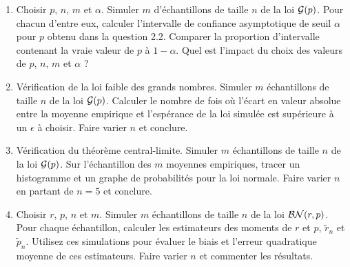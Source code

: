 \documentclass[12pt]{article}
\begin{document}
\begin{enumerate}

\renewcommand{\labelenumi}{\arabic{section}.\arabic{enumi}.}

\item Choisir $p$, $n$, $m$ et $\alpha$. Simuler $m$ d'échantillons de taille $n$ de la loi ${\cal G}(p)$. Pour chacun d'entre eux, calculer l'intervalle de confiance asymptotique de seuil $\alpha$ pour $p$ obtenu dans la question 2.2. Comparer la proportion d'intervalle contenant la vraie valeur de $p$ à $1-\alpha$. Quel est l'impact du choix des valeurs de $p$, $n$, $m$ et $\alpha$ ?

\vspace{3mm}

\item Vérification de la loi faible des grands nombres. Simuler $m$ échantillons de taille $n$ de la loi ${\cal G}(p)$. Calculer le nombre de fois où l'écart en valeur absolue entre la moyenne empirique et l'espérance de la loi simulée est supérieure à un $\epsilon$ à choisir. Faire varier $n$ et conclure.

\vspace{3mm}

\item Vérification du théorème central-limite. Simuler $m$ échantillons de taille $n$ de la loi ${\cal G}(p)$. Sur l'échantillon des $m$ moyennes empiriques, tracer un histogramme et un graphe de probabilités pour la loi normale. Faire varier $n$ en partant de $n=5$ et conclure.

\vspace{3mm}

\item Choisir $r$, $p$, $n$ et $m$. Simuler $m$ échantillons de taille $n$ de la loi ${\cal BN}(r,p)$. Pour chaque échantillon, calculer les estimateurs des moments de $r$ et $p$, $\tilde{r}_n$ et $\tilde{p}_n$. Utilisez ces simulations pour évaluer le biais et l'erreur quadratique moyenne de ces estimateurs. Faire varier $n$ et commenter les résultats.

\end{enumerate}
\end{document}
